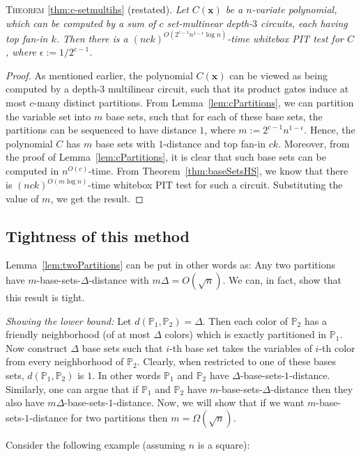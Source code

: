 \documentclass[final,oneeqnum, onethmnum, onefignum]{siamltex1213}
\renewcommand{\P}{\mathbb P}
\newcommand{\di}{\Delta} %
\newenvironment{reptheorem}[1]{T\textsc{heorem} \ref{#1} (restated).\em}{}
\begin{document}
\begin{reptheorem}{thm:c-setmultihs}
Let $C(\mathbf{x})$ be a $n$-variate polynomial, which can be computed by a sum of $c$ 
set-multinear depth-$3$ circuits, each having top fan-in $k$. 
Then there is a $(nck)^{O(2^{c-1} n^{1 - \epsilon} \log n) }$-time whitebox PIT test for $C$,
where $\epsilon := 1/2^{c-1}$.
\end{reptheorem}
\begin{proof}
As mentioned earlier, the polynomial $C(\mathbf{x})$ can be viewed as 
being computed by a depth-$3$ multilinear circuit, such that 
its product gates induce at most $c$-many distinct partitions. 
From Lemma~\ref{lem:cPartitions}, we can partition the variable set into
 $m$ base sets, such that for each of these base sets, the partitions can be sequenced
to have distance $1$, where $m := 2^{c-1} n^{1 - \epsilon}$.
Hence, the polynomial $C$ has $m$ base sets with $1$-distance and top fan-in $ck$.
Moreover, from the proof of Lemma~\ref{lem:cPartitions}, it is clear that 
such base sets can be computed in $n^{O(c)}$-time. 
From Theorem~\ref{thm:baseSetsHS}, we know that there is $(nck)^{O(m \log n)}$-time
whitebox PIT test for such a circuit. 
 Substituting
the value of $m$, we get the result. 
\end{proof}

\subsection*{Tightness of this method}
Lemma~\ref{lem:twoPartitions} can be put in other words as: 
Any two partitions have $m$-base-sets-$\di$-distance 
with $m \di = O(\sqrt{n})$. We can, in fact, show that this result is tight. 

\emph{Showing the lower bound:} Let $d(\P_1, \P_2) = \di$. Then each color of $\P_2$ has 
a friendly neighborhood (of at most $\di$ colors) which is exactly partitioned in
$\P_1$. Now construct $\di$ base sets such that $i$-th base set takes the variables 
of $i$-th color from every neighborhood of $\P_2$. Clearly, when restricted to one of these bases sets,
$d(\P_1,\P_2)$ is $1$. In other words $\P_1$ and $\P_2$ have $\di$-base-sets-$1$-distance.
Similarly, one can argue that if $\P_1$ and $\P_2$ have $m$-base-sets-$\di$-distance
then they also have $m \di$-base-sets-$1$-distance.
Now, we will show that if we want $m$-base-sets-$1$-distance for two partitions then $m = \Omega(\sqrt{n})$.

Consider the following example (assuming $n$ is a square): 
\end{document}
